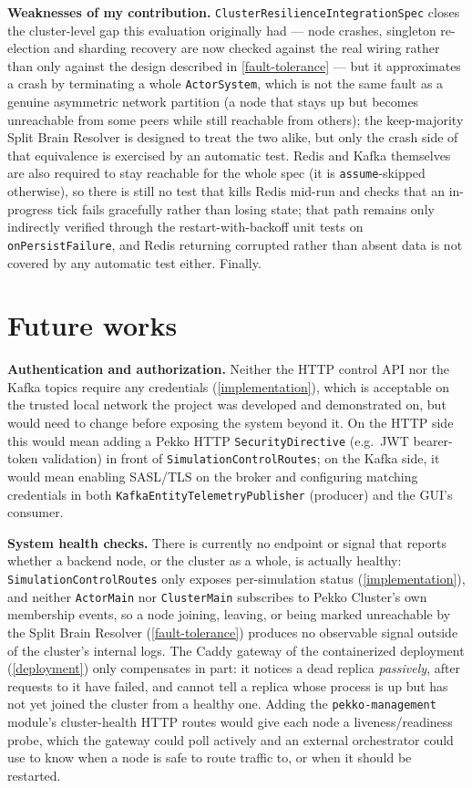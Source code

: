 \documentclass{scrreprt}
\begin{document}
\textbf{Weaknesses of my contribution.} \texttt{ClusterResilienceIntegrationSpec} closes the
cluster-level gap this evaluation originally had --- node crashes, singleton re-election and
sharding recovery are now checked against the real wiring rather than only against the design
described in \cref{fault-tolerance} --- but it approximates a crash by terminating a whole
\texttt{ActorSystem}, which is not the same fault as a genuine asymmetric network partition
(a node that stays up but becomes unreachable from some peers while still reachable from
others); the keep-majority Split Brain Resolver is designed to treat the two alike, but only the
crash side of that equivalence is exercised by an automatic test. Redis and Kafka themselves are
also required to stay reachable for the whole spec (it is \texttt{assume}-skipped otherwise), so
there is still no test that kills Redis mid-run and checks that an in-progress tick fails
gracefully rather than losing state; that path remains only indirectly verified through the
restart-with-backoff unit tests on \texttt{onPersistFailure}, and Redis returning corrupted
rather than absent data is not covered by any automatic test either. Finally.


\section{Future works}\label{future-works}

\textbf{Authentication and authorization.} Neither the HTTP control API nor the Kafka topics
require any credentials (\cref{implementation}), which is acceptable on the trusted local network
the project was developed and demonstrated on, but would need to change before exposing the system
beyond it. On the HTTP side this would mean adding a Pekko HTTP \texttt{SecurityDirective} (e.g.\
JWT bearer-token validation) in front of \texttt{SimulationControlRoutes}; on the Kafka side, it
would mean enabling SASL/TLS on the broker and configuring matching credentials in both
\texttt{KafkaEntityTelemetryPublisher} (producer) and the GUI's consumer.

\textbf{System health checks.} There is currently no endpoint or signal that reports whether a
backend node, or the cluster as a whole, is actually healthy: \texttt{SimulationControlRoutes}
only exposes per-simulation status (\cref{implementation}), and neither \texttt{ActorMain} nor
\texttt{ClusterMain} subscribes to Pekko Cluster's own membership events, so a node joining, leaving, or being marked unreachable
by the Split Brain Resolver (\cref{fault-tolerance}) produces no observable signal outside of the
cluster's internal logs. The Caddy gateway of the containerized deployment (\cref{deployment}) only compensates in part:
it notices a dead replica \emph{passively}, after requests to it have failed, and cannot tell a
replica whose process is up but has not yet joined the cluster from a healthy one. Adding the
\texttt{pekko-management} module's cluster-health HTTP routes would give each node a
liveness/readiness probe, which the gateway could poll actively and an external orchestrator
could use to know when a node is safe to route traffic to, or when it should be restarted.
\end{document}
